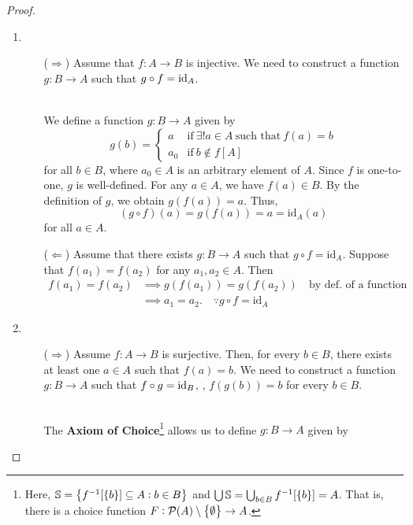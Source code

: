 \documentclass[11pt,openany]{article}
\begin{document}
\begin{proof}
\begin{enumerate}[(1)]
	\item \begin{itemize}
		\item[($\Rightarrow$)] Assume that $f:A\to B$ is injective. We need to construct a function $g:B\to A$ such that $g\circ f=\textnormal{id}_A$.
		\begin{figure}[h!]\centering
			
		\end{figure} \\
	We define a function $g:B\to A$ given by \[
	g(b)=\begin{cases}
			a &\text{if}\ \exists! a\in A\ \text{such that}\ f(a)=b \\
			a_0 &\text{if}\ b\notin f[A]
	\end{cases}
	\] for all $b\in B$, where $a_0\in A$ is an arbitrary element of $A$. Since $f$ is one-to-one, $g$ is well-defined.
	For any $a\in A$, we have $f(a)\in B$. By the definition of $g$, we obtain $g(f(a))=a. $ Thus, \[
	(g\circ f)(a)=g(f(a))=a=\text{id}_A(a)
	\] for all $a\in A$.
	\vfill
	\item[($\Leftarrow$)] Assume that there exists $g:B\to A$ such that $g\circ f=\text{id}_A$. Suppose that $f(a_1)=f(a_2)$ for any $a_1,a_2\in A$. Then \begin{align*}
		f(a_1)=f(a_2) &\implies g(f(a_1))=g(f(a_2))\quad\text{by def. of a function}\\
		&\implies a_1=a_2.\quad\because g\circ f=\text{id}_A
	\end{align*}
	\end{itemize}
	\item \begin{itemize}
		\item[($\Rightarrow$)] Assume $f:A\to B$ is surjective. Then, for every $b\in B$, there exists at least one $a\in A$ such that $f(a)=b$. We need to construct a function $g:B\to A$ such that $f\circ g=\textnormal{id}_B$, \ie, $f(g(b))=b$ for every $b\in B$.
		\begin{figure}[h!]\centering
			
		\end{figure} \\
		The \textbf{Axiom of Choice}\footnote{{Here, $\mathbb{S}=\set{f^{-1}[\set{b}]\subseteq A:b\in B}$ and $\bigcup\mathbb{S}=\bigcup_{b\in B}f^{-1}[\set{b}]=A$. That is, there is a choice function $F:\mathcal{P}(A)\setminus\set{\emptyset}\to A$.}} allows us to define $g:B\to A$ given by \[
\]
\end{itemize}
\end{enumerate}
\end{proof}
\end{document}
